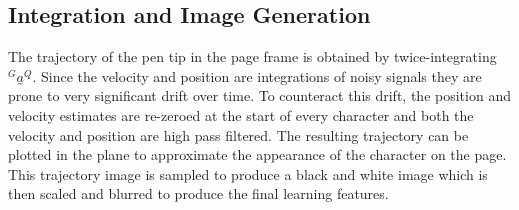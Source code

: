 \documentclass{article}
\begin{document}
\subsection{Integration and Image Generation}
The trajectory of the pen tip in the page frame is obtained by twice-integrating $^G \underset{\mbox{\textasciitilde}}{a}^Q$.
Since the velocity and position are integrations of noisy signals they are prone to very significant drift over time. To counteract this drift, the position and velocity estimates are re-zeroed at the start of every character and both the velocity and position are high pass filtered. The resulting trajectory can be plotted in the plane to approximate the appearance of the character on the page. This trajectory image is sampled to produce a black and white image which is then scaled and blurred to produce the final learning features.

\end{document}
